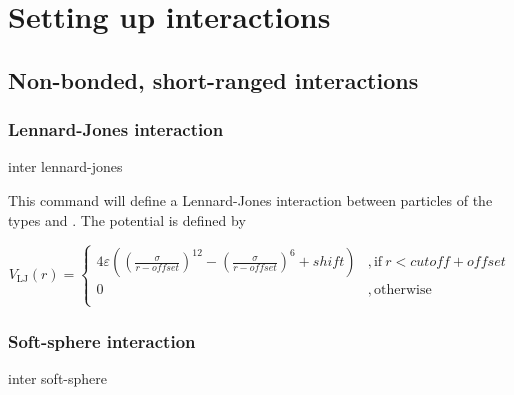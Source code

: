 \chapter{Setting up interactions}
\label{sec:inter}

\section{Non-bonded, short-ranged interactions}
\label{sec:inter-nb}

\subsection{Lennard-Jones interaction}

\begin{essyntax}
  inter  
  lennard-jones 
  \var{$\epsilon$} \var{$\sigma$} 
    
  \begin{features}
  \end{features}
\end{essyntax}
This command will define a Lennard-Jones interaction between particles
of the types  and .  The potential is defined by

\begin{equation}
  V_\mathrm{LJ}(r) = \left\{
    \begin{array}{ll}
      4\varepsilon((\frac{\sigma}{r-\mathit{offset}})^{12}
      -(\frac{\sigma}{r-\mathit{offset}})^6+\mathit{shift}) 
      & \mathrm{, if~} r < \mathit{cutoff}+\mathit{offset}\\
      \mathit{0} 
      & \mathrm{, otherwise}\\
    \end{array}
  \right.
\end{equation}

\subsection{Soft-sphere interaction}
\begin{essyntax}
  inter   
  soft-sphere    
\end{essyntax}

